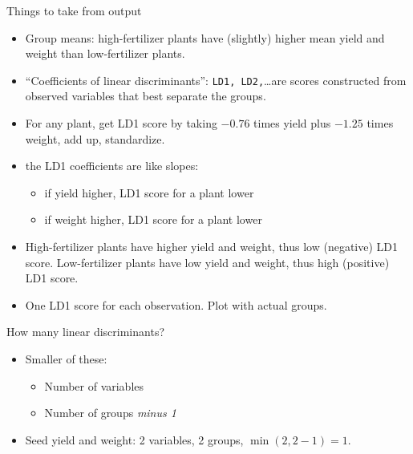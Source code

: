 \documentclass[
  ignorenonframetext,
]{beamer}
\providecommand{\tightlist}{%
  \setlength{\itemsep}{0pt}\setlength{\parskip}{0pt}}
\begin{document}
\begin{frame}{Things to take from output}
\protect\hypertarget{things-to-take-from-output}{}

\begin{itemize}
\item
  Group means: high-fertilizer plants have (slightly) higher mean yield
  and weight than low-fertilizer plants.
\item
  ``Coefficients of linear discriminants'': \texttt{LD1,
  LD2,}\ldots are scores constructed from observed variables that best
  separate the groups.
\item
  For any plant, get LD1 score by taking \(-0.76\) times yield plus
  \(-1.25\) times weight, add up, standardize.
\item
  the LD1 coefficients are like slopes:

  \begin{itemize}
  \tightlist
  \item
    if yield higher, LD1 score for a plant lower
  \item
    if weight higher, LD1 score for a plant lower
  \end{itemize}
\item
  High-fertilizer plants have higher yield and weight, thus low
  (negative) LD1 score. Low-fertilizer plants have low yield and weight,
  thus high (positive) LD1 score.
\item
  One LD1 score for each observation. Plot with actual groups.
\end{itemize}

\end{frame}

\begin{frame}{How many linear discriminants?}
\protect\hypertarget{how-many-linear-discriminants}{}

\begin{itemize}
\item
  Smaller of these:

  \begin{itemize}
  \item
    Number of variables
  \item
    Number of groups \emph{minus 1}
  \end{itemize}
\item
  Seed yield and weight: 2 variables, 2 groups, \(\min(2,2-1)=1\).
\end{itemize}

\end{frame}
\end{document}
